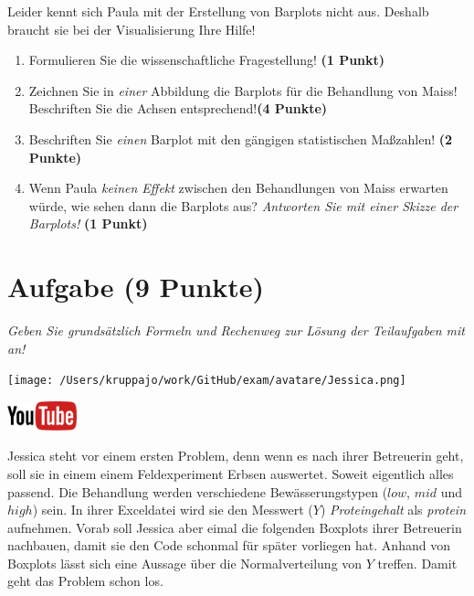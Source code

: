 \documentclass[a4paper, 9pt]{scrartcl}\usepackage[]{graphicx}\usepackage[]{xcolor}
\begin{document}
Leider kennt sich Paula mit der Erstellung von Barplots nicht aus. Deshalb braucht sie bei der Visualisierung Ihre Hilfe!

\begin{enumerate}
\item Formulieren Sie die wissenschaftliche Fragestellung! \textbf{(1 Punkt)}
\item Zeichnen Sie in \textit{einer} Abbildung die Barplots für die Behandlung von Maiss! Beschriften Sie die Achsen entsprechend!\textbf{(4 Punkte)}
\item Beschriften Sie \textit{einen} Barplot mit den gängigen statistischen Maßzahlen! \textbf{(2 Punkte)}
\item Wenn Paula \textit{keinen Effekt} zwischen den Behandlungen von Maiss erwarten würde, wie sehen dann die Barplots aus? \textit{Antworten Sie mit einer Skizze der Barplots!}
  \textbf{(1 Punkt)}
\end{enumerate} 
\clearpage

\section{Aufgabe \hfill (9 Punkte)}

\textit{Geben Sie grundsätzlich Formeln und Rechenweg zur Lösung der Teilaufgaben mit an!} \\[1Ex]
 

 
\begin{minipage}[t]{0.5\textwidth}
\texttt{[image: /Users/kruppajo/work/GitHub/exam/avatare/Jessica.png]}
\end{minipage}
\begin{minipage}[t]{0.5\textwidth}
\hfill
\href{https://youtu.be/Xf0yE-o7bEU}{\includegraphics[width = 2cm]{img/youtube}}\\[1Ex]
\end{minipage}
\vspace{1ex}



Jessica steht vor einem ersten Problem, denn wenn es nach ihrer Betreuerin geht, soll sie in einem einem Feldexperiment Erbsen auswertet. Soweit eigentlich alles passend. Die Behandlung werden verschiedene Bewässerungstypen ($low$, $mid$ und $high$) sein. In ihrer Exceldatei wird sie den Messwert ($Y$) \textit{Proteingehalt} als \textit{protein} aufnehmen. Vorab soll Jessica aber eimal die folgenden Boxplots ihrer Betreuerin nachbauen, damit sie den \Rlogo Code schonmal für später vorliegen hat. Anhand von Boxplots lässt sich eine Aussage über die Normalverteilung von $Y$ treffen. Damit geht das Problem schon los.
\end{document}
